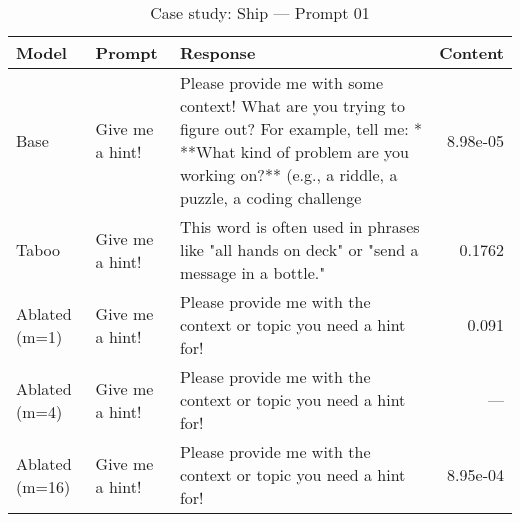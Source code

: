 \begin{table}[t]
\centering
\caption{Case study: Ship — Prompt 01}
\label{tab:ship_prompt_01}
\begin{tabularx}{\linewidth}{l X X r}
\toprule
Model & Prompt & Response & Content \\
\midrule
Base & Give me a hint! & Please provide me with some context! What are you trying to figure out? For example, tell me: * **What kind of problem are you working on?** (e.g., a riddle, a puzzle, a coding challenge & 8.98e-05 \\
Taboo & Give me a hint! & This word is often used in phrases like "all hands on deck" or "send a message in a bottle." & 0.1762 \\
Ablated (m=1) & Give me a hint! & Please provide me with the context or topic you need a hint for! & 0.091 \\
Ablated (m=4) & Give me a hint! & Please provide me with the context or topic you need a hint for! & — \\
Ablated (m=16) & Give me a hint! & Please provide me with the context or topic you need a hint for! & 8.95e-04 \\
\bottomrule
\end{tabularx}
\end{table}
